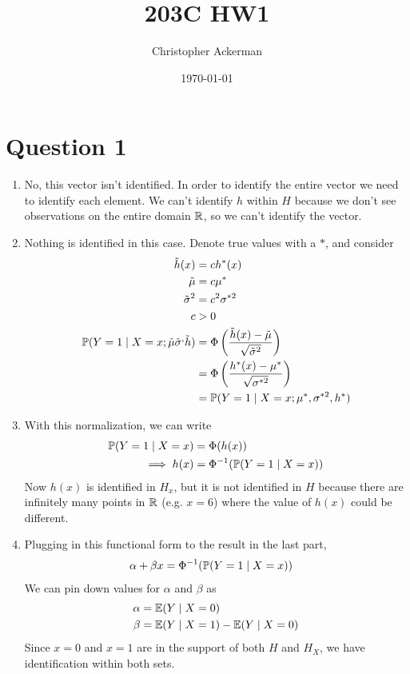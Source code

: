 
\usepackage[space]{grffile}

\title{203C HW1}
\author{Christopher Ackerman}
\date{\today}


\maketitle

\section{Question 1}
\begin{enumerate}
\item No, this vector isn't identified. In order to identify the entire vector we need to identify each element. We can't identify $h$ within $H$ because we don't see observations on the entire domain $\mathbb{R}$, so we can't identify the vector.

\item Nothing is identified in this case. Denote true values with a $\ast$, and consider
  \begin{align*}
    \tilde{h}(x) &= c h^\ast(x)\\
    \tilde{\mu} &= c \mu^\ast \\
    \tilde{\sigma}^2 &= c^2 \sigma^{\ast 2}\\
    c &> 0\\
    \mathbb{P}(Y = 1 \mid X = x; \tilde{\mu} \tilde{\sigma}^, \tilde{h}) &= \Phi \left(\frac{\tilde{h}(x) - \tilde{\mu}}{\sqrt{\tilde{\sigma}^2}}\right)\\
                 &= \Phi \left(\frac{h^\ast(x) - \mu^\ast}{\sqrt{\sigma^{\ast 2}}}\right)\\
    &= \mathbb{P}(Y = 1 \mid X= x; \mu^\ast, \sigma^{\ast 2}, h^\ast)
  \end{align*}
\item With this normalization, we can write
  \begin{align*}
    \mathbb{P}(Y = 1 \mid X = x) &= \Phi ( h(x)) \\
    \implies h(x) &= \Phi^{-1}(\mathbb{P}(Y = 1 \mid X = x))
  \end{align*}
  Now $h(x)$ is identified in $H_x$, but it is not identified in $H$ because there are infinitely many points in $\mathbb{R}$ (e.g. $x = 6$) where the value of $h(x)$ could be different.
\item Plugging in this functional form to the result in the last part,
  \begin{align*}
    \alpha + \beta x &= \Phi^{-1}(\mathbb{P} (Y = 1 \mid X = x))
  \end{align*}
  We can pin down values for $\alpha$ and $\beta$ as
  \begin{align*}
    \alpha &= \mathbb{E}(Y \mid X = 0)\\
    \beta &= \mathbb{E}(Y \mid X = 1) - \mathbb{E}(Y \mid X = 0)
  \end{align*}
  Since $x= 0$ and $x = 1$ are in the support of both $H$ and $H_X$, we have identification within both sets.
\end{enumerate}

